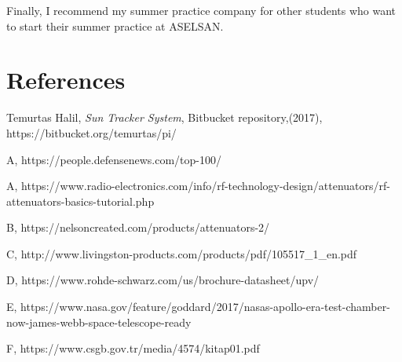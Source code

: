 	
	Finally, I recommend my summer practice company for other students who want to start their summer practice at ASELSAN. 

\-\vfill 


\section{References}

\begingroup
\renewcommand{\section}[2]{}%
\begin{thebibliography}{}

 Temurtas Halil,
	\textit{Sun Tracker System},
	Bitbucket repository,(2017),
	https://bitbucket.org/temurtas/pi/
	
	A,	
https://people.defensenews.com/top-100/	
	
	A,
	https://www.radio-electronics.com/info/rf-technology-design/attenuators/rf-attenuators-basics-tutorial.php

	B,
	https://nelsoncreated.com/products/attenuators-2/ 

	C,
	http://www.livingston-products.com/products/pdf/105517\_1\_en.pdf

	D,
	https://www.rohde-schwarz.com/us/brochure-datasheet/upv/

	E,
	https://www.nasa.gov/feature/goddard/2017/nasas-apollo-era-test-chamber-now-james-webb-space-telescope-ready

	F,
https://www.csgb.gov.tr/media/4574/kitap01.pdf

\end{thebibliography}
\endgroup

\vfill


\appendix









